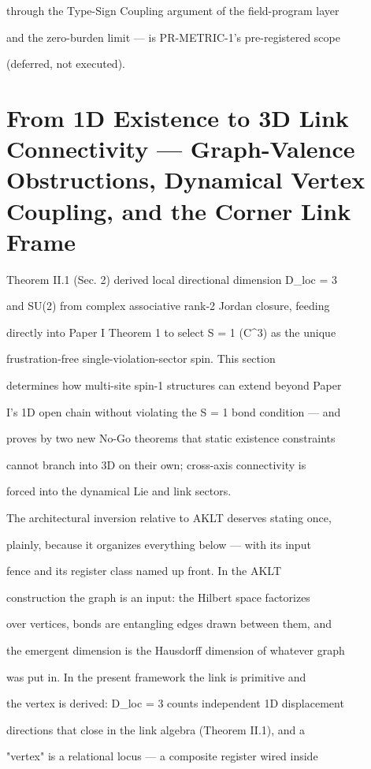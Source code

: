 \documentclass[11pt,a4paper]{article}
\theoremstyle{definition}
\begin{document}
through the Type-Sign Coupling argument of the field-program layer

and the zero-burden limit — is PR-METRIC-1's pre-registered scope

(deferred, not executed).




\section{From 1D Existence to 3D Link Connectivity — Graph-Valence Obstructions, Dynamical Vertex Coupling, and the Corner Link Frame}

Theorem II.1 (Sec. 2) derived local directional dimension D\_loc = 3

and SU(2) from complex associative rank-2 Jordan closure, feeding

directly into Paper I Theorem 1 to select S = 1 (C\^{}3) as the unique

frustration-free single-violation-sector spin. This section

determines how multi-site spin-1 structures can extend beyond Paper

I's 1D open chain without violating the S = 1 bond condition — and

proves by two new No-Go theorems that static existence constraints

cannot branch into 3D on their own; cross-axis connectivity is

forced into the dynamical Lie and link sectors.


The architectural inversion relative to AKLT deserves stating once,

plainly, because it organizes everything below — with its input

fence and its register class named up front. In the AKLT

construction the graph is an input: the Hilbert space factorizes

over vertices, bonds are entangling edges drawn between them, and

the emergent dimension is the Hausdorff dimension of whatever graph

was put in. In the present framework the link is primitive and

the vertex is derived: D\_loc = 3 counts independent 1D displacement

directions that close in the link algebra (Theorem II.1), and a

"vertex" is a relational locus — a composite register wired inside
\end{document}

